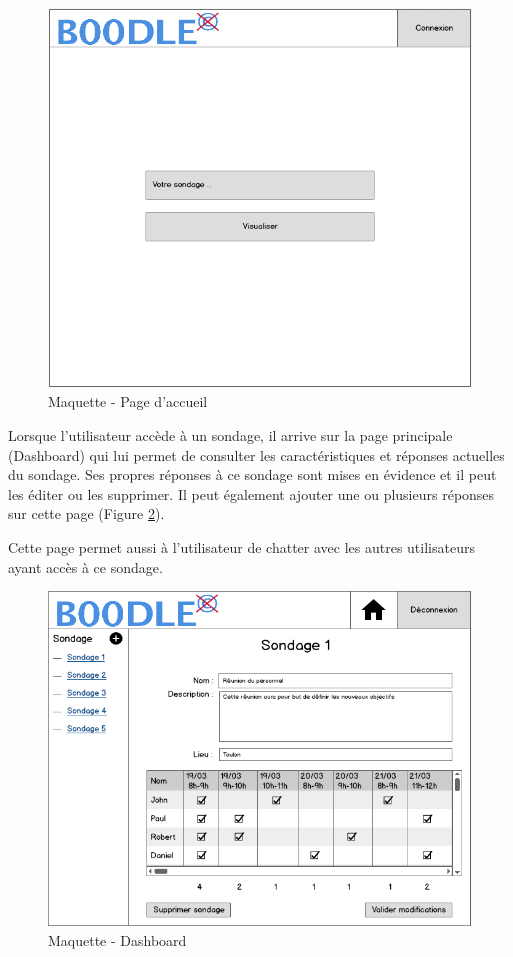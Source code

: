 \documentclass[titlepage]{report}
\begin{document}
\begin{figure}[h]
	\caption{Maquette - Page d'accueil}
	\label{maquette_accueil}
	\centering
	\includegraphics[scale=0.7]{figures/maquettes/accueil.png}
\end{figure}

\par Lorsque l'utilisateur accède à un sondage, il arrive sur la page principale (Dashboard) qui lui permet de consulter les caractéristiques et réponses actuelles du sondage. 
Ses propres réponses à ce sondage sont mises en évidence et il peut les éditer ou les supprimer. 
Il peut également ajouter une ou plusieurs réponses sur cette page (Figure \ref{maquette_dashboard}).
\par Cette page permet aussi à l'utilisateur de chatter avec les autres utilisateurs ayant accès à ce sondage.

\begin{figure}[h]
	\caption{Maquette - Dashboard}
	\label{maquette_dashboard}
	\centering
	\includegraphics[scale=0.7]{figures/maquettes/dashboard.png}
\end{figure}
\end{document}
